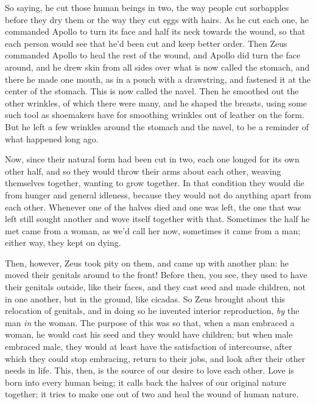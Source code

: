  So saying, he cut those human beings in two, the way people cut
sorbapples before they dry them or the way they cut eggs with hairs. As
he cut each one, he commanded Apollo to turn its face and half its neck
towards the wound, so that each person would see that he’d been cut and
keep better order. Then Zeus commanded Apollo to heal the rest of the
wound, and Apollo did turn the face around, and he drew skin from all
sides over what is now called the stomach, and there he made one mouth,
as in a pouch with a drawstring, and fastened it at the center of the
stomach.  This is now called the navel. Then he smoothed
out the other wrinkles, of which there were many, and he shaped the
breasts, using some such tool as shoemakers have for smoothing wrinkles
out of leather on the form. But he left a few wrinkles around the
stomach and the navel, to be a reminder of what happened long ago.

Now, since their natural form had been cut in two, each one longed for
its own other half, and so they would throw their arms about each other,
weaving themselves together, wanting to grow together. In that condition
 they would die from hunger and general idleness, because they
would not do anything apart from each other. Whenever one of the halves
died and one was left, the one that was left still sought another and
wove itself together with that. Sometimes the half he met came from a
woman, as we’d call her now, sometimes it came from a man; either way,
they kept on dying.

Then, however, Zeus took pity on them, and came up with another plan: he
moved their genitals around to the front! Before then, you see, they
 used to have their genitals outside, like their faces, and they
cast seed and made children, not in one another, but in the ground, like
cicadas. So Zeus brought about this relocation of genitals, and in doing
so he invented interior reproduction, {\em by} the man {\em in} the
woman. The purpose of this was so that, when a man embraced a woman, he
would cast his seed and they would have children; but when male embraced
male, they would at least have the satisfaction of intercourse, after
which they could stop embracing,  return to their jobs, and look
after their other needs in life. This, then, is the source of our desire
to love each other. Love is born into every human being; it calls back
the halves of our original nature together; it tries to make one out of
two and heal the wound of human nature.

